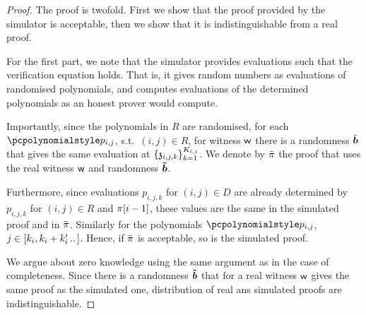 \documentclass[runningheads,11pt]{llncs}
\let\spvec\vec
\let\vec\accentvec
\let\spvec\vec
\let\vec\spvec
\def\vec#1{\mathchoice{\mbox{\boldmath$\displaystyle#1$}}
  {\mbox{\boldmath$\textstyle#1$}} {\mbox{\boldmath$\scriptstyle#1$}}
  {\mbox{\boldmath$\scriptscriptstyle#1$}}}
\begin{document}
\begin{proof}
  The proof is twofold. First we show that the proof provided by the simulator is
  acceptable, then we show that it is indistinguishable from a real proof.

   For the first part, we note that the simulator provides
  evaluations such that the verification equation holds. That is, it gives random
  numbers as evaluations of randomised polynomials, and computes evaluations of the
  determined polynomials as an honest prover would compute.

  Importantly, since the polynomials in $R$ are randomised, for each $\p{p}_{i, j}$,
  s.t.~$(i, j) \in R$, for witness $\mathsf{w}$ there is a randomness $\tilde{\vec{b}}$
  that gives the same evaluation at $\{\mathfrak{z}_{i, j, k}\}_{k = 1}^{K_{i, j}}$.
   We denote by $\tilde{\pi}$ the
  proof that uses the real witness $\mathsf{w}$ and randomness $\vec{\tilde{b}}$.

  Furthermore, since evaluations $p_{i, j, k}$ for $(i, j) \in D$ are already
  determined by $p_{i, j, k}$ for $(i, j) \in R$ and $\pi [i - 1]$, these values
  are the same in the simulated proof and in $\tilde{\pi}$. Similarly for the
  polynomials $\p{p}_{i, j}$, $j \in \range{k_i, k_i + k'_{i}}$. Hence, if
  $\tilde{\pi}$ is acceptable, so is the simulated proof.
  
   We argue about zero knowledge using the same argument as in
  the case of completeness. Since there is a randomness $\vec{\tilde{b}}$ that for a
  real witness $\mathsf{w}$ gives the same proof as the simulated one, distribution of real
  ans simulated proofs are indistinguishable. 
   

  \iffalse
  Both in the real and simulated proofs polynomials in $R$ are
  randomized, hence any evaluation on them gives a random field element, hence for
  these evaluations distributions of the proofs are the same.

  According to the definition, polynomials in $D$ are already determined by the state
  of the transcript and previously picked polynomials. 

  Since protocol messages are determined by the actual state of the proof transcript
  and the witness and the simulator computes them as an honest prover would compute,
  the distributions of the real and simulated proofs do not differ here as well.
  \fi
\end{proof}
\end{document}
